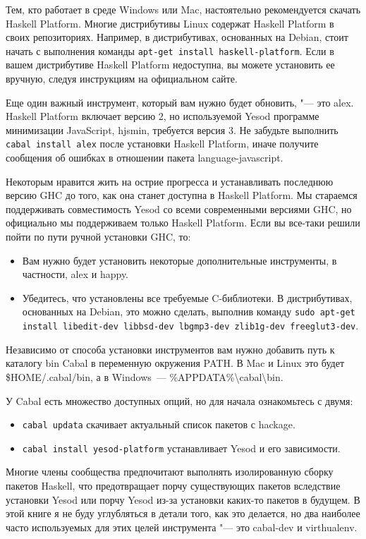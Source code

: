Тем, кто работает в среде Windows или Mac, настоятельно рекомендуется скачать Haskell Platform. Многие дистрибутивы Linux содержат Haskell Platform в своих репозиториях. Например, в дистрибутивах, основанных на Debian, стоит начать с выполнения команды \lstinline'apt-get install haskell-platform'. Если в вашем дистрибутиве Haskell Platform недоступна, вы можете установить ее вручную, следуя инструкциям на официальном сайте.

Еще один важный инструмент, который вам нужно будет обновить, "--- это alex. Haskell Platform включает версию 2, но используемой Yesod программе минимизации JavaScript, hjsmin, требуется версия 3. Не забудьте выполнить \lstinline'cabal install alex' после установки Haskell Platform, иначе получите сообщения об ошибках в отношении пакета language-javascript.

Некоторым нравится жить на острие прогресса и устанавливать последнюю версию GHC до того, как она станет доступна в Haskell Platform. Мы стараемся поддерживать совместимость Yesod со всеми современными версиями GHC, но официально мы поддерживаем только Haskell Platform. Если вы все-таки решили пойти по пути ручной установки GHC, то:

\begin{itemize}
  \item Вам нужно будет установить некоторые дополнительные инструменты, в частности, alex и happy.
  \item Убедитесь, что установлены все требуемые C-библиотеки. В дистрибутивах, основанных на Debian, это можно сделать, выполнив команду \lstinline'sudo apt-get install libedit-dev libbsd-dev lbgmp3-dev zlib1g-dev freeglut3-dev'.
\end{itemize}

Независимо от способа установки инструментов вам нужно добавить путь к каталогу bin Cabal в переменную окружения PATH. В Mac и Linux это будет \$HOME/.cabal/bin, а в Windows~--- \%APPDATA\%\textbackslash{}cabal\textbackslash{}bin.

У Cabal есть множество доступных опций, но для начала ознакомьтесь с двумя:

\begin{itemize}
  \item \lstinline'cabal updata' скачивает актуальный список пакетов с hackage.
  \item \lstinline'cabal install yesod-platform' устанавливает Yesod и его зависимости.
\end{itemize}

Многие члены сообщества предпочитают выполнять изолированную сборку пакетов Haskell, что предотвращает порчу существующих пакетов вследствие установки Yesod или порчу Yesod из-за установки каких-то пакетов в будущем. В этой книге я не буду углубляться в детали того, как это делается, но два наиболее часто используемых для этих целей инструмента "--- это cabal-dev и virthualenv.

